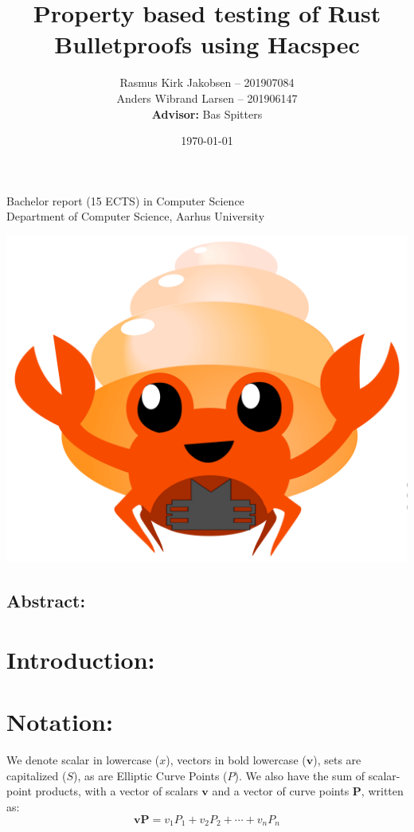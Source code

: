 \documentclass{article}
\title{Property based testing of Rust Bulletproofs using Hacspec}
\author{ 
Rasmus Kirk Jakobsen -- 201907084\\
Anders Wibrand Larsen -- 201906147\\
\textbf{Advisor:} Bas Spitters
}
\date{\today}
\renewcommand{\vec}[1]{\mathbf{#1}}
\begin{document}
\maketitle

\begin{center}
    Bachelor report (15 ECTS) in Computer Science\\
Department of Computer Science, Aarhus University\\
\end{center} 

\begin{center}
	\includegraphics[scale=0.4]{img/bulletproof-hacspec-2.png}
\end{center} 

\subsection*{Abstract:}

\tableofcontents

\newpage


\section{Introduction:} \label{Introduction}
\section{Notation:} \label{notation}

We denote scalar in lowercase ($x$), vectors in bold lowercase
($\vec{v}$), sets are capitalized ($S$), as are Elliptic Curve
Points ($P$). We also have the sum of scalar-point products, with a vector of scalars $\vec{v}$ and a vector of curve points $\vec{P}$, written as:
$$\vec{vP} = v_1 P_1 + v_2 P_2 + \cdots + v_n P_n$$
\end{document}
